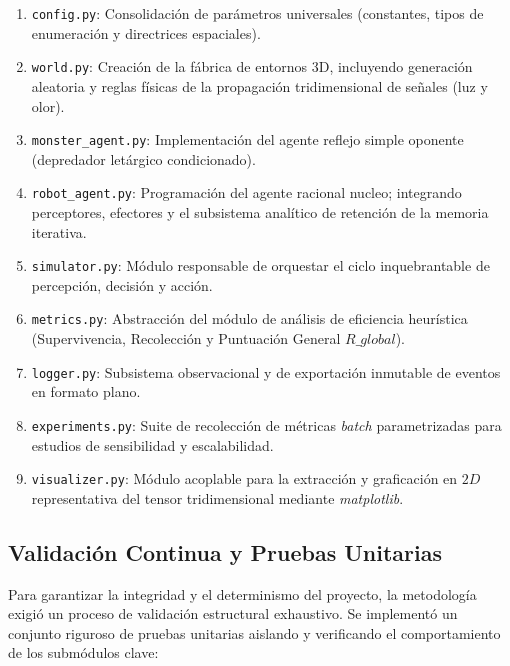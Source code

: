 \documentclass[conference]{IEEEtran}
\begin{document}
\begin{enumerate}
    \item \texttt{config.py}: Consolidación de parámetros universales (constantes, tipos de enumeración y directrices espaciales).
    \item \texttt{world.py}: Creación de la fábrica de entornos 3D, incluyendo generación aleatoria y reglas físicas de la propagación tridimensional de señales (luz y olor).
    \item \texttt{monster\_agent.py}: Implementación del agente reflejo simple oponente (depredador letárgico condicionado).
    \item \texttt{robot\_agent.py}: Programación del agente racional nucleo; integrando perceptores, efectores y el subsistema analítico de retención de la memoria iterativa.
    \item \texttt{simulator.py}: Módulo responsable de orquestar el ciclo inquebrantable de percepción, decisión y acción.
    \item \texttt{metrics.py}: Abstracción del módulo de análisis de eficiencia heurística (Supervivencia, Recolección y Puntuación General $R\_global$).
    \item \texttt{logger.py}: Subsistema observacional y de exportación inmutable de eventos en formato plano.
    \item \texttt{experiments.py}: Suite de recolección de métricas \textit{batch} parametrizadas para estudios de sensibilidad y escalabilidad.
    \item \texttt{visualizer.py}: Módulo acoplable para la extracción y graficación en $2D$ representativa del tensor tridimensional mediante \textit{matplotlib}.
\end{enumerate}

\subsection{Validación Continua y Pruebas Unitarias}
Para garantizar la integridad y el determinismo del proyecto, la metodología exigió un proceso de validación estructural exhaustivo. Se implementó un conjunto riguroso de pruebas unitarias aislando y verificando el comportamiento de los submódulos clave:
\end{document}
